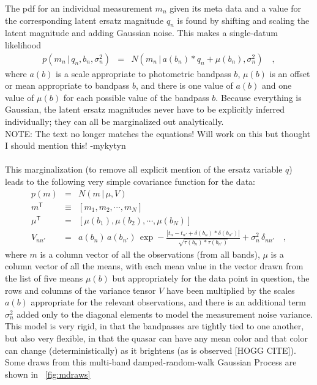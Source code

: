 \documentclass[letterpaper,12pt,preprint]{aastex}
\newcommand{\given}{\,|\,}
\newcommand{\transpose}[1]{{#1}^{\mathsf{T}}}
\begin{document}
The pdf for an individual measurement $m_n$ given its meta data and a
value for the corresponding latent ersatz magnitude $q_n$ is found by
shifting and scaling the latent magnitude and adding Gaussian noise.
This makes a single-datum likelihood
\begin{eqnarray}
p(m_n\given q_n,b_n,\sigma_n^2) &=& N(m_n\given a(b_n) * q_n + \mu(b_n), \sigma_n^2)
\quad ,
\end{eqnarray}
where $a(b)$ is a scale appropriate to photometric bandpass $b$,
$\mu(b)$ is an offset or mean appropriate to bandpass $b$, and there
is one value of $a(b)$ and one value of $\mu(b)$ for each possible
value of the bandpass $b$.  Because everything is Gaussian, the latent
ersatz magnitudes never have to be explicitly inferred individually;
they can all be marginalized out analytically.
\\
NOTE: The text no longer matches the equations! Will work on this but thought I should mention this! -mykytyn\\
\\
This marginalization (to remove all explicit mention of the ersatz
variable $q$) leads to the following very simple covariance function
for the data:
\begin{eqnarray}
p(m) &=& N(m\given \mu,V)
\label{eq:likestart}
\\
\transpose{m} &\equiv& [m_1, m_2, \cdots , m_N]
\\
\transpose{\mu} &=& [\mu(b_1), \mu(b_2), \cdots , \mu(b_N)]
\\
V_{nn'} &=& a(b_n)\,a(b_{n'})\,\exp -\frac{|t_n - t_{n'}+\delta(b_n)*\delta(b_{n'})|}{\sqrt{\tau(b_n)*\tau(b_{n'})}} + \sigma_n^2\,\delta_{nn'}
\label{eq:likeend}
\quad ,
\end{eqnarray}
where $m$ is a column vector of all the observations (from all bands),
$\mu$ is a column vector of all the means, with each mean value in the
vector drawn from the list of five means $\mu(b)$ but appropriately
for the data point in question, the rows and columns of the variance
tensor $V$ have been multiplied by the scales $a(b)$ appropriate for
the relevant observations, and there is an additional term
$\sigma_n^2$ added only to the diagonal elements to model the
measurement noise variance.  This model is very rigid, in that the
bandpasses are tightly tied to one another, but also very flexible, in
that the quasar can have any mean color and that color can change
(deterministically) as it brightens (as is observed [HOGG CITE]).
Some draws from this multi-band damped-random-walk Gaussian Process
are shown in \figurename~\ref{fig:mdraws}
\end{document}
